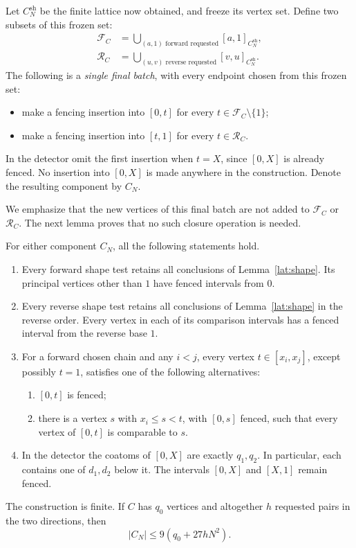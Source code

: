 Let $C^{\mathrm{sh}}_N$ be the finite lattice now obtained, and freeze
its vertex set.  Define two subsets of this frozen set:
\begin{align}
\label{lat:label-sets}
 \mathcal F_C
   &=\bigcup_{(a,1)\text{ forward requested}}
          [a,1]_{C^{\mathrm{sh}}_N},\\
 \mathcal R_C
   &=\bigcup_{(u,v)\text{ reverse requested}}
          [v,u]_{C^{\mathrm{sh}}_N}.
\end{align}
The following is a \emph{single final batch}, with every endpoint
chosen from this frozen set:
\begin{itemize}
\item make a fencing insertion into $[0,t]$ for every
  $t\in\mathcal F_C\setminus\{1\}$;
\item make a fencing insertion into $[t,1]$ for every
  $t\in\mathcal R_C$.
\end{itemize}
In the detector omit the first insertion when $t=X$, since $[0,X]$
is already fenced.  No insertion into $[0,X]$ is made anywhere in the
construction.  Denote the resulting component by $C_N$.

We emphasize that the new vertices of this final batch are not added
to $\mathcal F_C$ or $\mathcal R_C$.  The next lemma proves that no
such closure operation is needed.

\begin{lemma}
\label{lat:simultaneous}
For either component $C_N$, all the following statements hold.
\begin{enumerate}[label=\textnormal{(\roman*)}]
\item Every forward shape test retains all conclusions of
  Lemma~\ref{lat:shape}.  Its principal vertices other than $1$ have
  fenced intervals from $0$.
\item Every reverse shape test retains all conclusions of
  Lemma~\ref{lat:shape} in the reverse order.  Every vertex in each
  of its comparison intervals has a fenced interval from the reverse
  base $1$.
\item For a forward chosen chain and any $i<j$, every vertex
  $t\in[x_i,x_j]$, except possibly $t=1$, satisfies one of the
  following alternatives:
  \begin{enumerate}[label=\textnormal{(\alph*)}]
  \item $[0,t]$ is fenced;
  \item there is a vertex $s$ with $x_i\leq s<t$, with $[0,s]$
    fenced, such that every vertex of $[0,t]$ is comparable to $s$.
  \end{enumerate}
\item In the detector the coatoms of $[0,X]$ are exactly $q_1,q_2$.
  In particular, each contains one of $d_1,d_2$ below it.  The
  intervals $[0,X]$ and $[X,1]$ remain fenced.
\end{enumerate}
The construction is finite.  If $C$ has $q_0$ vertices and altogether
$h$ requested pairs in the two directions, then
\[
             |C_N|\leq9(q_0+27hN^2).
\]
\end{lemma}

